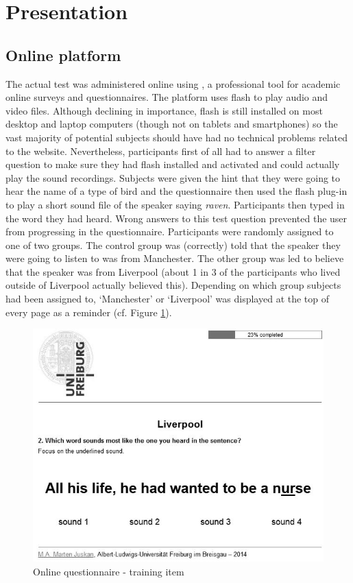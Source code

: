 \section{Presentation}
\label{sec.perc_method.pres}

\subsection{Online platform}
\label{sec.perc_method.pres.platform}

The actual test was administered online using \textcite{sosci}, a professional tool for academic online surveys and questionnaires.
The platform uses flash to play audio and video files.
Although declining in importance, flash is still installed on most desktop and laptop computers (though not on tablets and smartphones) so the vast majority of potential subjects should have had no technical problems related to the website.
Nevertheless, participants first of all had to answer a filter question to make sure they had flash installed and activated and could actually play the sound recordings.
Subjects were given the hint that they were going to hear the name of a type of bird and the questionnaire then used the flash plug-in to play a short sound file of the speaker saying \emph{raven}.
Participants then typed in the word they had heard.
Wrong answers to this test question prevented the user from progressing in the questionnaire.
Participants were randomly assigned to one of two groups.
The control group was (correctly) told that the speaker they were going to listen to was from Manchester.
The other group was led to believe that the speaker was from Liverpool (about 1 in 3 of the participants who lived outside of Liverpool actually believed this).
Depending on which group subjects had been assigned to, `Manchester' or `Liverpool' was displayed at the top of every page as a reminder (cf. Figure \ref{fig.online.screenshot}).

\begin{figure}[h]
	\includegraphics[width=\textwidth]{./figures/questionnaire_screenshot}
	\caption{Online questionnaire - training item}
	\label{fig.online.screenshot}
\end{figure}

